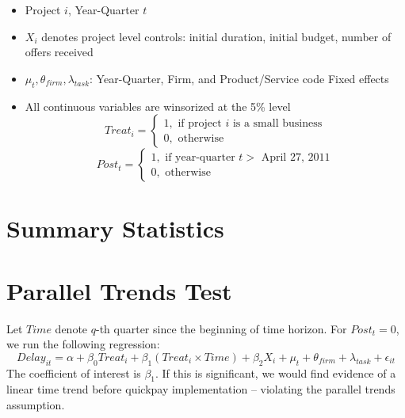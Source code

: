 \documentclass[
]{article}
\providecommand{\tightlist}{%
  \setlength{\itemsep}{0pt}\setlength{\parskip}{0pt}}
\begin{document}
\begin{itemize}
\tightlist
\item
  Project \(i\), Year-Quarter \(t\)
\item
  \(X_i\) denotes project level controls: initial duration, initial
  budget, number of offers received
\item
  \(\mu_t,\theta_{firm},\lambda_{task}\): Year-Quarter, Firm, and
  Product/Service code Fixed effects
\item
  All continuous variables are winsorized at the 5\% level
  \[ Treat_i = \begin{cases} 1, \text{ if project } i \text{ is a small business}\\
  0, \text{ otherwise} \end{cases}\]
  \[ Post_t = \begin{cases} 1, \text{ if year-quarter } t > \text{ April 27, 2011}\\
  0, \text{ otherwise} \end{cases}\]
\end{itemize}

\hypertarget{summary-statistics}{%
\section{Summary Statistics}\label{summary-statistics}}

\hypertarget{parallel-trends-test}{%
\section{Parallel Trends Test}\label{parallel-trends-test}}

Let \(Time\) denote \(q\)-th quarter since the beginning of time
horizon. For \(Post_t =0\), we run the following regression:
\[ Delay_{it} = \alpha+\beta_0 Treat_i + \beta_1 (Treat_i \times Time) + \beta_2 X_i + \mu_t + \theta_{firm} + \lambda_{task} +\epsilon_{it}\]
The coefficient of interest is \(\beta_1\). If this is significant, we
would find evidence of a linear time trend before quickpay
implementation -- violating the parallel trends assumption.
\end{document}
